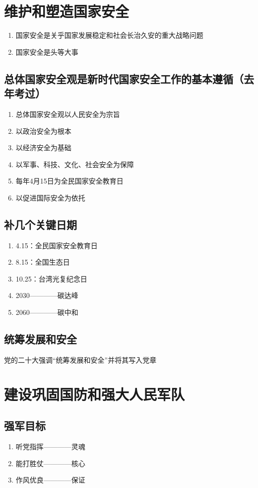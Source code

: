 \documentclass{ctexart}
\numberwithin{figure}{section}
\numberwithin{equation}{section}
\begin{document}
\section{维护和塑造国家安全}
    \begin{tcolorbox}[colback=blue!5!white]
    \begin{enumerate}
        \item 国家安全是关乎国家发展稳定和社会长治久安的重大战略问题
        \item 国家安全是头等大事
    \end{enumerate}
    \end{tcolorbox}
    \subsection{总体国家安全观是新时代国家安全工作的基本遵循（去年考过）}
    \begin{enumerate}
        \item 总体国家安全观以人民安全为宗旨
        \item 以政治安全为根本
        \item 以经济安全为基础
        \item 以军事、科技、文化、社会安全为保障
        \item 每年4月15日为全民国家安全教育日
        \item 以促进国际安全为依托
    \end{enumerate}
    \subsection{补几个关键日期}
    \begin{enumerate}
        \item 4.15：全民国家安全教育日
        \item 8.15：全国生态日
        \item 10.25：台湾光复纪念日
        \item 2030————碳达峰
        \item 2060————碳中和
    \end{enumerate}
    \subsection{统筹发展和安全}
    党的二十大强调“统筹发展和安全”并将其写入党章
\section{建设巩固国防和强大人民军队}
    \subsection{强军目标}
    \begin{enumerate}
        \item 听党指挥————灵魂
        \item 能打胜仗————核心
        \item 作风优良————保证
    \end{enumerate}
\end{document}
